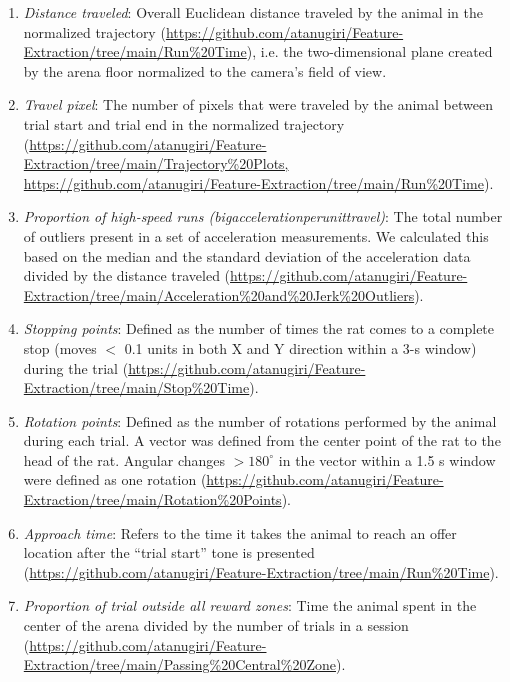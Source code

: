 \documentclass{article}
\begin{document}
\vspace{1em}

\begin{enumerate}
    \item \textit{Distance traveled}: Overall Euclidean distance traveled by the animal in the normalized trajectory (\url{https://github.com/atanugiri/Feature-Extraction/tree/main/Run%20Time}), i.e. the two-dimensional plane created by the arena floor normalized to the camera’s field of view.
    \item \textit{Travel pixel}: The number of pixels that were traveled by the animal between trial start and trial end in the normalized trajectory (\url{https://github.com/atanugiri/Feature-Extraction/tree/main/Trajectory%20Plots, https://github.com/atanugiri/Feature-Extraction/tree/main/Run%20Time}). 
    \item \textit{Proportion of high-speed runs (bigaccelerationperunittravel)}: The total number of outliers present in a set of acceleration measurements. We calculated this based on the median and the standard deviation of the acceleration data divided by the distance traveled (\url{https://github.com/atanugiri/Feature-Extraction/tree/main/Acceleration%20and%20Jerk%20Outliers}).
    \item \textit{Stopping points}: Defined as the number of times the rat comes to a complete stop (moves $<$ 0.1 units in both X and Y direction within a 3-s window) during the trial (\url{https://github.com/atanugiri/Feature-Extraction/tree/main/Stop%20Time}).
    \item \textit{Rotation points}: Defined as the number of rotations performed by the animal during each trial. A vector was defined from the center point of the rat to the head of the rat. Angular changes $>180^\circ$ in the vector within a 1.5 s window were defined as one rotation (\url{https://github.com/atanugiri/Feature-Extraction/tree/main/Rotation%20Points}).
    \item \textit{Approach time}: Refers to the time it takes the animal to reach an offer location after the “trial start” tone is presented (\url{https://github.com/atanugiri/Feature-Extraction/tree/main/Run%20Time}).
    \item \textit{Proportion of trial outside all reward zones}: Time the animal spent in the center of the arena divided by the number of trials in a session (\url{https://github.com/atanugiri/Feature-Extraction/tree/main/Passing%20Central%20Zone}).
\end{enumerate}
\end{document}
